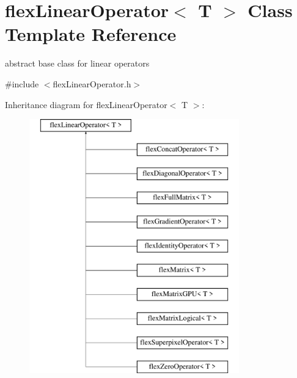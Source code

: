 \hypertarget{classflex_linear_operator}{}\section{flex\+Linear\+Operator$<$ T $>$ Class Template Reference}
\label{classflex_linear_operator}


abstract base class for linear operators  




{\ttfamily \#include $<$flex\+Linear\+Operator.\+h$>$}

Inheritance diagram for flex\+Linear\+Operator$<$ T $>$\+:\begin{figure}[H]
\begin{center}
\leavevmode
\includegraphics[height=11.000000cm]{classflex_linear_operator}
\end{center}
\end{figure}
